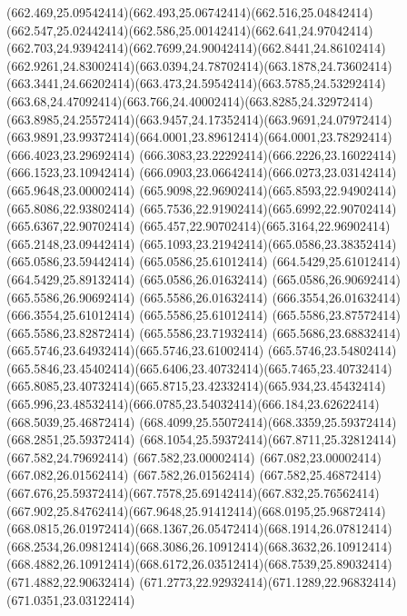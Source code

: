 {{	\curveto(662.469,25.09542414)(662.493,25.06742414)(662.516,25.04842414)
	\curveto(662.547,25.02442414)(662.586,25.00142414)(662.641,24.97042414)
	\curveto(662.703,24.93942414)(662.7699,24.90042414)(662.8441,24.86102414)
	\curveto(662.9261,24.83002414)(663.0394,24.78702414)(663.1878,24.73602414)
	\curveto(663.3441,24.66202414)(663.473,24.59542414)(663.5785,24.53292414)
	\curveto(663.68,24.47092414)(663.766,24.40002414)(663.8285,24.32972414)
	\curveto(663.8985,24.25572414)(663.9457,24.17352414)(663.9691,24.07972414)
	\curveto(663.9891,23.99372414)(664.0001,23.89612414)(664.0001,23.78292414)
	\closepath
	\moveto(666.4023,23.29692414)
	\curveto(666.3083,23.22292414)(666.2226,23.16022414)(666.1523,23.10942414)
	\curveto(666.0903,23.06642414)(666.0273,23.03142414)(665.9648,23.00002414)
	\curveto(665.9098,22.96902414)(665.8593,22.94902414)(665.8086,22.93802414)
	\curveto(665.7536,22.91902414)(665.6992,22.90702414)(665.6367,22.90702414)
	\curveto(665.457,22.90702414)(665.3164,22.96902414)(665.2148,23.09442414)
	\curveto(665.1093,23.21942414)(665.0586,23.38352414)(665.0586,23.59442414)
	\lineto(665.0586,25.61012414)
	\lineto(664.5429,25.61012414)
	\lineto(664.5429,25.89132414)
	\lineto(665.0586,26.01632414)
	\lineto(665.0586,26.90692414)
	\lineto(665.5586,26.90692414)
	\lineto(665.5586,26.01632414)
	\lineto(666.3554,26.01632414)
	\lineto(666.3554,25.61012414)
	\lineto(665.5586,25.61012414)
	\lineto(665.5586,23.87572414)
	\lineto(665.5586,23.82872414)
	\lineto(665.5586,23.71932414)
	\curveto(665.5686,23.68832414)(665.5746,23.64932414)(665.5746,23.61002414)
	\lineto(665.5746,23.54802414)
	\curveto(665.5846,23.45402414)(665.6406,23.40732414)(665.7465,23.40732414)
	\curveto(665.8085,23.40732414)(665.8715,23.42332414)(665.934,23.45432414)
	\curveto(665.996,23.48532414)(666.0785,23.54032414)(666.184,23.62622414)
	\closepath
	\moveto(668.5039,25.46872414)
	\curveto(668.4099,25.55072414)(668.3359,25.59372414)(668.2851,25.59372414)
	\curveto(668.1054,25.59372414)(667.8711,25.32812414)(667.582,24.79692414)
	\lineto(667.582,23.00002414)
	\lineto(667.082,23.00002414)
	\lineto(667.082,26.01562414)
	\lineto(667.582,26.01562414)
	\lineto(667.582,25.46872414)
	\curveto(667.676,25.59372414)(667.7578,25.69142414)(667.832,25.76562414)
	\curveto(667.902,25.84762414)(667.9648,25.91412414)(668.0195,25.96872414)
	\curveto(668.0815,26.01972414)(668.1367,26.05472414)(668.1914,26.07812414)
	\curveto(668.2534,26.09812414)(668.3086,26.10912414)(668.3632,26.10912414)
	\curveto(668.4882,26.10912414)(668.6172,26.03512414)(668.7539,25.89032414)
	\closepath
	\moveto(671.4882,22.90632414)
	\curveto(671.2773,22.92932414)(671.1289,22.96832414)(671.0351,23.03122414)
}}

